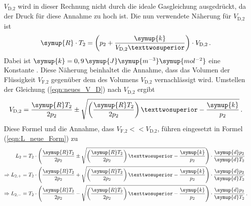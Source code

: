     $V_{\text{D,2}}$ wird in dieser Rechnung nicht durch die ideale Gasgleichung ausgedrückt, da der Druck für diese
    Annahme zu hoch ist. Die nun verwendete Näherung für $V_{\text{D,2}}$ ist
    \begin{equation}
      \symup{R} \cdot T_2 = \left(p_2 + \frac{\symup{k}}{V_{\text{D,2}}²}\right) \cdot V_{\text{D,2}} \, .
      \label{eqn:neues_V_D}
    \end{equation}
    Dabei ist $\symup{k} = 0,9 \, \symup{J}\symup{m^{-3}}\symup{mol^{-2}}$ eine Konstante \cite{anleitungV203}. Diese Näherung 
    beinhaltet die Annahme, dass das Volumen der Flüssigkeit $V_{\text{F,2}}$ gegenüber dem des Volumens $V_{\text{D,2}}$ vernachlässigt
    wird. 
    Umstellen der Gleichung (\ref{eqn:neues_V_D}) nach $V_{\text{D,2}}$ ergibt
    \begin{equation}
      V_{\text{D,2}} = \frac{\symup{R}T_2}{2 p_2} \pm \sqrt{\left(\frac{\symup{R}T_2}{2p_2}\right)² - \frac{\symup{k}}{p_2}} \, .
    \end{equation}
    Diese Formel und die Annahme, dass $V_{\text{F,2}} << V_{\text{D,2}}$, führen eingesetzt in Formel (\ref{eqn:L_neue_Form}) zu 
    \begin{align*}
      L_2 &= T_2 \cdot \left(\frac{\symup{R}T_2}{2 p_2} \pm \sqrt{\left(\frac{\symup{R}T_2}{2p_2}\right)² - \frac{\symup{k}}{p_2}}\right) \cdot \frac{\symup{d}p_2}{\symup{d}T_2} \\
      \Rightarrow L_{2,+} &= T_2 \cdot \left(\frac{\symup{R}T_2}{2 p_2} + \sqrt{\left(\frac{\symup{R}T_2}{2p_2}\right)² - \frac{\symup{k}}{p_2}}\right) \cdot \frac{\symup{d}p_2}{\symup{d}T_2} \\
      \Rightarrow L_{2,-} &= T_2 \cdot \left(\frac{\symup{R}T_2}{2 p_2} - \sqrt{\left(\frac{\symup{R}T_2}{2p_2}\right)² - \frac{\symup{k}}{p_2}}\right) \cdot \frac{\symup{d}p_2}{\symup{d}T_2} \, .
    \end{align*}
    
